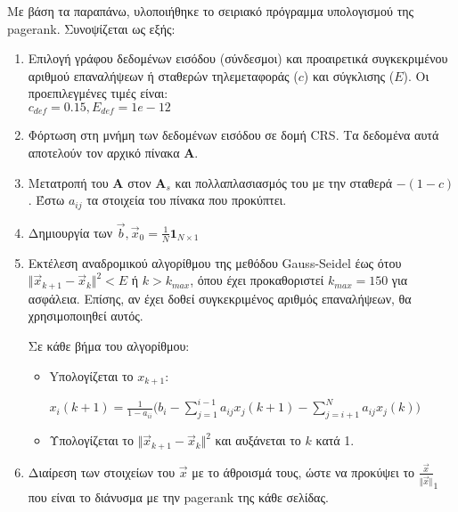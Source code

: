 Με βάση τα παραπάνω, υλοποιήθηκε το σειριακό πρόγραμμα υπολογισμού της pagerank. Συνοψίζεται ως εξής:
\begin{enumerate}

\item Επιλογή γράφου δεδομένων εισόδου (σύνδεσμοι) και προαιρετικά συγκεκριμένου αριθμού επαναλήψεων ή σταθερών τηλεμεταφοράς ($c$) και σύγκλισης ($E$). Οι προεπιλεγμένες τιμές είναι: \\ $c_{def} = 0.15, E_{def} = 1e-12$

\item Φόρτωση στη μνήμη των δεδομένων εισόδου σε δομή CRS. Tα δεδομένα αυτά αποτελούν τον αρχικό πίνακα $\bm{A}$.

\item Μετατροπή του $\bm{A}$ στον $\bm{A}_s$ και πολλαπλασιασμός του με την σταθερά $-(1-c)$. Έστω $a_{ij}$ τα στοιχεία του πίνακα που προκύπτει.

\item Δημιουργία των $\vec{b},\vec{x}_0=\frac{1}{N}\bm{1}_{N\times1}$

\item Εκτέλεση αναδρομικού αλγορίθμου της μεθόδου Gauss-Seidel έως ότου $\Vert\vec{x}_{k+1}-\vec{x}_k\Vert^2 < E$ ή $k > k_{max}$, όπου έχει προκαθοριστεί $k_{max} = 150$ για ασφάλεια. Επίσης, αν έχει δοθεί συγκεκριμένος αριθμός επαναλήψεων, θα χρησιμοποιηθεί αυτός.

Σε κάθε βήμα του αλγορίθμου:
\begin{itemize}[leftmargin=*]
\item Yπολογίζεται το $x_{k+1}$:

\hfil$\displaystyle x_i(k+1) = \frac{1}{1-a_{ii}}\bigg(b_i-\sum_{j=1}^{i-1}a_{ij}x_j(k+1)-\sum_{j=i+1}^{N}a_{ij}x_j(k)\bigg)$\hfil

\item Υπολογίζεται το $\Vert\vec{x}_{k+1}-\vec{x}_k\Vert^2$ και αυξάνεται το $k$ κατά 1.

\end{itemize}
\item Διαίρεση των στοιχείων του $\vec{x}$ με το άθροισμά τους, ώστε να προκύψει το $\frac{\vec{x}}{\Vert\vec{x}\Vert}_1$ που είναι το διάνυσμα με την pagerank της κάθε σελίδας.
\end{enumerate}
